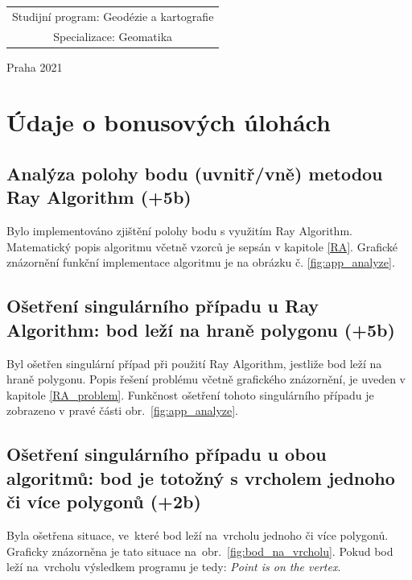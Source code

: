 \documentclass[a4paper, 12pt, oneside, titlepage]{article} %
\begin{document}
\begin{center}
\begin{tabular}{c}
Studijní program: Geodézie a kartografie \\
\noalign{\vspace{2mm}}

Specializace: Geomatika\\

\end{tabular}


\vfill

Praha 2021

\end{center}



\clearpage
\section{Údaje o bonusových úlohách}
\subsection{Analýza polohy bodu (uvnitř/vně) metodou Ray Algorithm (+5b)}
Bylo implementováno zjištění polohy bodu s využitím Ray Algorithm. Matematický popis algoritmu včetně vzorců je sepsán v kapitole \ref{RA}. Grafické znázornění funkční implementace algoritmu je na obrázku č. \ref{fig:app_analyze}. 


\subsection{Ošetření singulárního případu u Ray Algorithm: bod leží na hraně polygonu (+5b)}
Byl ošetřen singulární případ při použití Ray Algorithm, jestliže bod leží na hraně polygonu. Popis řešení problému včetně grafického znázornění, je uveden v kapitole \ref{RA_problem}. Funkčnost ošetření tohoto singulárního případu je zobrazeno v pravé části obr.~\ref{fig:app_analyze}.


\subsection{Ošetření singulárního případu u obou algoritmů: bod je totožný s vrcholem jednoho či více polygonů (+2b)}
Byla ošetřena situace, ve~které bod leží na~vrcholu jednoho či více polygonů. Graficky znázorněna je tato situace na~obr.~\ref{fig:bod_na_vrcholu}. Pokud bod leží na~vrcholu výsledkem programu je tedy: \emph{Point is on the vertex}.
\end{document}
